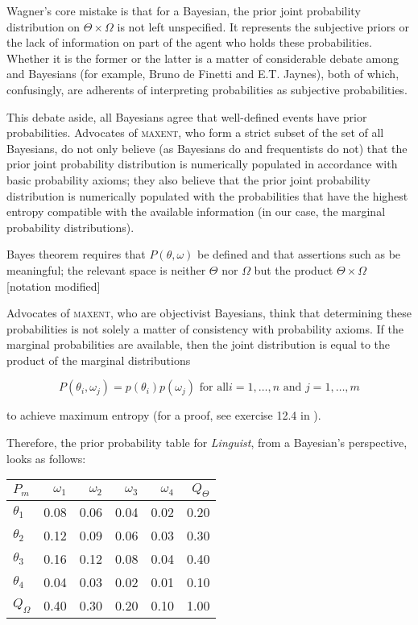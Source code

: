 \documentclass[11pt]{article}
\begin{document}
Wagner's core mistake is that for a Bayesian, the prior joint
probability distribution on $\Theta\times\Omega$ is not left
unspecified. It represents the subjective priors or the lack of
information on part of the agent who holds these probabilities.
Whether it is the former or the latter is a matter of considerable
debate among  and  Bayesians
(for example, Bruno de Finetti and E.T. Jaynes), both of which,
confusingly, are adherents of interpreting probabilities as subjective
probabilities. 

This debate aside, all Bayesians agree that well-defined events have
prior probabilities. Advocates of \textsc{maxent}, who form a strict
subset of the set of all Bayesians, do not only believe (as Bayesians
do and frequentists do not) that the prior joint probability
distribution is numerically populated in accordance with basic
probability axioms; they also believe that the prior joint probability
distribution is numerically populated with the probabilities that have
the highest entropy compatible with the available information (in our
case, the marginal probability distributions).

\begin{quotex}
  Bayes theorem requires that $P(\theta,\omega)$ be defined and that
  assertions such as  be
  meaningful; the relevant space is neither $\Theta$ nor $\Omega$ but
  the product $\Theta\times\Omega$ [notation modified]
\end{quotex}

Advocates of \textsc{maxent}, who are objectivist Bayesians, think
that determining these probabilities is not solely a matter of
consistency with probability axioms. If the marginal probabilities are
available, then the joint distribution is equal to the product of the
marginal distributions

\begin{equation}
  \label{eq:prod}
P(\theta_{i},\omega_{j})=p(\theta_{i})p(\omega_{j})\mbox{ for all
}i=1,\ldots,n\mbox{ and }j=1,\ldots,m
\end{equation}

to achieve maximum entropy (for a proof, see exercise 12.4 in
).

Therefore, the prior probability table for \emph{Linguist},
from a Bayesian's perspective, looks as follows:

\medskip

\begin{tabular}{|l|r|r|r|r|r|}\hline
  $P_{m}$ & $\omega_{1}$ & $\omega_{2}$ & $\omega_{3}$ & $\omega_{4}$ & $Q_{\Theta}$ \\ \hline
$\theta_{1}$ & 0.08 & 0.06 & 0.04 & 0.02 & 0.20 \\ \hline
$\theta_{2}$ & 0.12 & 0.09 & 0.06 & 0.03 & 0.30 \\ \hline
$\theta_{3}$ & 0.16 & 0.12 & 0.08 & 0.04 & 0.40 \\ \hline
$\theta_{4}$ & 0.04 & 0.03 & 0.02 & 0.01 & 0.10 \\ \hline
$Q_{\Omega}$ & 0.40 & 0.30 & 0.20 & 0.10 & 1.00\\ \hline
\end{tabular}
\end{document}

